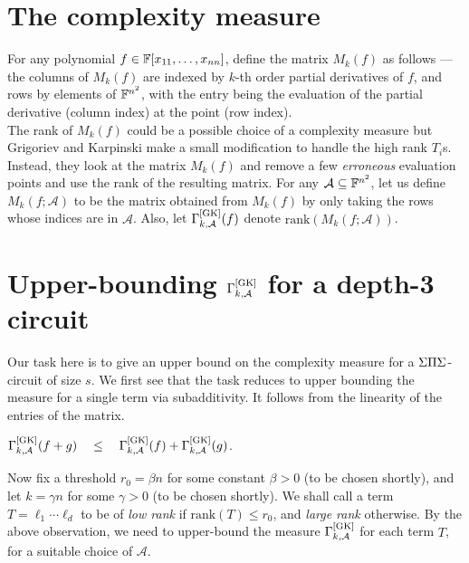 \section{The complexity measure}

For any polynomial $f \in \mathbb{F}[x_{11},\dots, x_{nn}]$, define the matrix $M_k(f)$ as follows --- the columns of $M_k(f)$ are indexed by $k$-th order partial derivatives of $f$, and rows by elements of $\mathbb{F}^{n^2}$, with the entry being the evaluation of the partial derivative (column
index) at the point (row index).\\

The rank of $M_k(f)$ could be a possible choice of a complexity measure but Grigoriev and Karpinski make a small modification to handle the high rank $T_i$s. Instead, they look at the matrix $M_k(f)$ and remove a few \emph{erroneous} evaluation points and use the rank of the resulting matrix. For any $\mathcal{A}\subseteq \mathbb{F}^{n^2}$, let us define $M_k(f;\mathcal{A})$ to be the matrix obtained from $M_k(f)$ by only taking the rows whose indices are in $\mathcal{A}$. Also, let $\Gamma^{\mathrm{[GK]}}_{k,\mathcal{A}}(f)$ denote $\mathrm{rank}(M_k(f;\mathcal{A}))$.



\section{Upper-bounding $\Gamma^{\mathrm{[GK]}}_{k,\mathcal{A}}$ for a depth-3 circuit}\label{sec:gk-upper-bound}

Our task here is to give an upper bound on the complexity measure for a $\Sigma\Pi\Sigma$-circuit of size $s$. We first see that the task reduces to upper bounding the measure for a single term via subadditivity. It follows from the linearity of the entries of the matrix.

\begin{observation}\label{obs:GK-subadditivity}
  $\Gamma^{\mathrm{[GK]}}_{k,\mathcal{A}}(f + g) \quad\leq\quad \Gamma^{\mathrm{[GK]}}_{k,\mathcal{A}}(f) + \Gamma^{\mathrm{[GK]}}_{k,\mathcal{A}}(g)$.
\end{observation}

Now fix a threshold $r_0 = \beta n$ for some constant $\beta > 0$ (to be chosen shortly), and let $k = \gamma n$ for some $\gamma>0$ (to be chosen shortly). We shall call a term $T = \ell_1\cdots \ell_d$ to be of \emph{low rank} if $\mathrm{rank}(T) \leq r_0$, and \emph{large rank} otherwise. By the above observation, we need to upper-bound the measure $\Gamma^{\mathrm{[GK]}}_{k,\mathcal{A}}$ for each term $T$, for a
suitable choice of $\mathcal{A}$.\\


